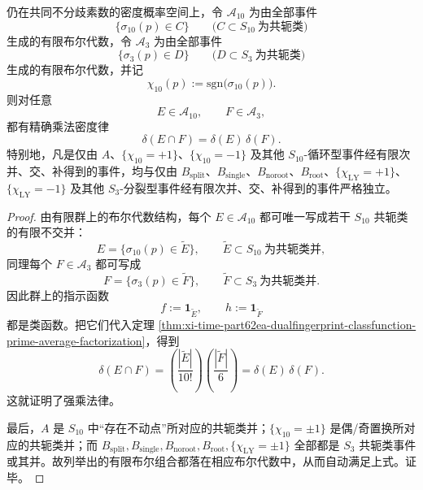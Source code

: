 \begin{theorem}[双指纹有限布尔组合的强乘法律]\label{thm:xi-time-part62ea-dualfingerprint-boolean-strong-product-law}
仍在共同不分歧素数的密度概率空间上，令 \(\mathcal A_{10}\) 为由全部事件
\[
\{\sigma_{10}(p)\in C\}
\qquad
\bigl(C\subset S_{10}\ \text{为共轭类}\bigr)
\]
生成的有限布尔代数，令 \(\mathcal A_3\) 为由全部事件
\[
\{\sigma_3(p)\in D\}
\qquad
\bigl(D\subset S_3\ \text{为共轭类}\bigr)
\]
生成的有限布尔代数，并记
\[
\chi_{10}(p):=\mathrm{sgn}\!\bigl(\sigma_{10}(p)\bigr).
\]
则对任意
\[
E\in\mathcal A_{10},
\qquad
F\in\mathcal A_3,
\]
都有精确乘法密度律
\[
\delta(E\cap F)=\delta(E)\,\delta(F).
\]
特别地，凡是仅由 \(A\)、\(\{\chi_{10}=+1\}\)、\(\{\chi_{10}=-1\}\) 及其他 \(S_{10}\)-循环型事件经有限次并、交、补得到的事件，均与仅由 \(B_{\mathrm{split}}\)、\(B_{\mathrm{single}}\)、\(B_{\mathrm{noroot}}\)、\(B_{\mathrm{root}}\)、\(\{\chi_{\mathrm{LY}}=+1\}\)、\(\{\chi_{\mathrm{LY}}=-1\}\) 及其他 \(S_3\)-分裂型事件经有限次并、交、补得到的事件严格独立。
\end{theorem}
\begin{proof}
由有限群上的布尔代数结构，每个 \(E\in\mathcal A_{10}\) 都可唯一写成若干 \(S_{10}\) 共轭类的有限不交并：
\[
E=\{\sigma_{10}(p)\in \widetilde E\},
\qquad
\widetilde E\subset S_{10}\ \text{为共轭类并},
\]
同理每个 \(F\in\mathcal A_3\) 都可写成
\[
F=\{\sigma_3(p)\in \widetilde F\},
\qquad
\widetilde F\subset S_3\ \text{为共轭类并}.
\]
因此群上的指示函数
\[
f:=\mathbf 1_{\widetilde E},
\qquad
h:=\mathbf 1_{\widetilde F}
\]
都是类函数。把它们代入定理
\ref{thm:xi-time-part62ea-dualfingerprint-classfunction-prime-average-factorization}，得到
\[
\delta(E\cap F)
=
\left(\frac{|\widetilde E|}{10!}\right)
\left(\frac{|\widetilde F|}{6}\right)
=
\delta(E)\,\delta(F).
\]
这就证明了强乘法律。

最后，\(A\) 是 \(S_{10}\) 中“存在不动点”所对应的共轭类并；\(\{\chi_{10}=\pm1\}\) 是偶/奇置换所对应的共轭类并；而 \(B_{\mathrm{split}},B_{\mathrm{single}},B_{\mathrm{noroot}},B_{\mathrm{root}},\{\chi_{\mathrm{LY}}=\pm1\}\) 全部都是 \(S_3\) 共轭类事件或其并。故列举出的有限布尔组合都落在相应布尔代数中，从而自动满足上式。证毕。
\end{proof}

\endinput
